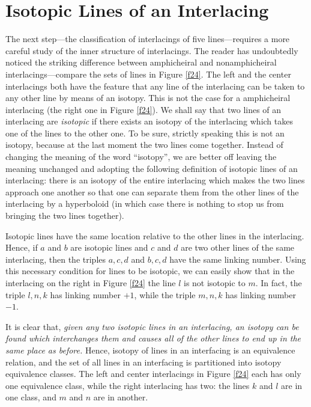 \documentclass{article}
\begin{document}
\section{ Isotopic Lines of an Interlacing}

The next step---the classification of interlacings of five lines---requires a
more careful study of the inner structure of interlacings. The reader has
undoubtedly noticed the striking difference between amphicheiral and nonamphicheiral
interlacings---compare the sets of lines in Figure \ref{f24}. The left 
and the center
interlacings both have the feature that any line of the interlacing can be
taken to any other line by means of an isotopy. This is not the case for a
amphicheiral interlacing (the right one in Figure \ref{f24}). We shall 
say that two lines of
an interlacing are {\em isotopic\/} if there exists an isotopy of the
interlacing which takes one of the lines to the other one. To be sure, strictly
speaking this is not an isotopy, because at the last moment the two lines come
together. Instead of changing the meaning of the word ``isotopy'', we are 
better
off leaving the meaning unchanged and adopting the following definition of
isotopic lines of an interlacing: there is an isotopy 
of the entire interlacing
which makes the two lines approach one another so that one can separate them
from the other lines of the interlacing by a hyperboloid (in which case there
is nothing to stop us from bringing the two lines together).

Isotopic lines have the same location relative to the other lines in the
interlacing. Hence, if $a$ and $b$ are isotopic lines and $c$ and $d$ are two
other lines of the same interlacing, then the triples $a,c,d$ and $b,c,d$ have
the same linking number. Using this necessary condition for lines to be
isotopic, we can easily show that in the interlacing on the right in 
Figure \ref{f24}
the line $l$ is not isotopic to $m$. In fact, the triple $l,n,k$ has linking
number $+1$, while the triple $m,n,k$ has linking number $-1$.

It is clear that, {\em given any two isotopic lines in an interlacing, 
an isotopy
can be found which interchanges them and causes all of the other lines to end
up in the same place as before. }
Hence, isotopy of lines in an interfacing is an
equivalence relation, and the set of all lines in an interfacing is 
partitioned
into isotopy equivalence classes. The left and center interlacings in 
Figure \ref{f24}
each has only one equivalence class, while the right interlacing has two: the
lines $k$ and $l$ are in one class, and $m$ and $n$ are in another.
\end{document}
